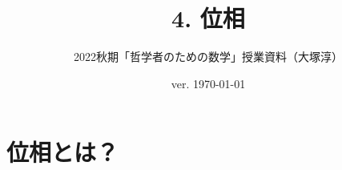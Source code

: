 \documentclass[11pt,a4paper]{jsarticle}
\begin{document}
\title{4. 位相}
\author{2022秋期「哲学者のための数学」授業資料（大塚淳）}
\date{ver. \today}
\maketitle

\section{位相とは？}
\end{document}
